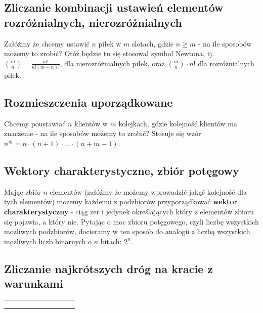 \documentclass[11pt]{article}
\theoremstyle{definition}
\numberwithin{zadanie}{subsection}
\begin{document}
\subsection{Zliczanie kombinacji ustawień elementów rozróżnialnych, nierozróżnialnych}

Załóżmy że chcemy ustawić $n$ piłek w $m$ slotach, gdzie $n\geq m$ - na ile sposobów możemy to zrobić? Otóż będzie tu się stosował symbol Newtona, tj. $\binom m n = \frac{m!}{n!(m-n)!}$, dla nierozróżnialnych piłek, oraz $\binom m n\cdot n!$ dla rozróżnialnych piłek.

\subsection{Rozmieszczenia uporządkowane}

Chcemy poustawiać $n$ klientów w $m$ kolejkach, gdzie kolejność klientów ma znaczenie - na ile sposobów możemy to zrobić? Stosuje się wzór $n^{\overline{m}} = n\cdot(n+1)\cdot...\cdot(n+m-1)$.

\subsection{Wektory charakterystyczne, zbiór potęgowy}

Mając zbiór $n$ elementów (załóżmy że możemy wprowadzić jakąś kolejność dla tych elementów) możemy każdemu z podzbiorów przyporządkować \textbf{wektor charakterystyczny} - ciąg zer i jedynek określających który z elementów zbioru się pojawia, a który nie. Pytając o moc zbioru potęgowego, czyli liczbę wszystkich możliwych podzbiorów, docieramy w ten sposób do analogii z liczbą wszystkich możliwych liczb binarnych o $n$ bitach: $2^n$.

\subsection{Zliczanie najkrótszych dróg na kracie z warunkami}


\begin{center}
    \begin{tabular}{ |c|c|c|c|c|c|c|c|c|c| }
        \hline
         &  &  &  &  &  &  &  &  & \\
        \hline
         &  &  &  &  &  &  &  &  & \\
        \hline
         &  &  &  &  &  &  &  &  & \\
        \hline
         &  &  &  &  &  &  &  &  & \\
        \hline
    \end{tabular}
\end{center}
\end{document}
